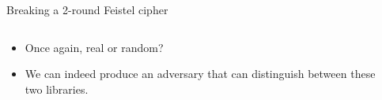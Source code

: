 \documentclass[aspectratio=169, lualatex, handout]{beamer}
\begin{document}
\begin{frame}{Breaking a 2-round Feistel cipher}
	\begin{columns}[c]
		\begin{column}{0.4\textwidth}
			\begin{itemize}
				\item Once again, real or random?
				\item We can indeed produce an adversary \prog{} that can distinguish between these two libraries.
			\end{itemize}
		\end{column}
		\begin{column}{0.6\textwidth}
			\begin{center}
			\end{center}
		\end{column}
	\end{columns}
\end{frame}
\end{document}
